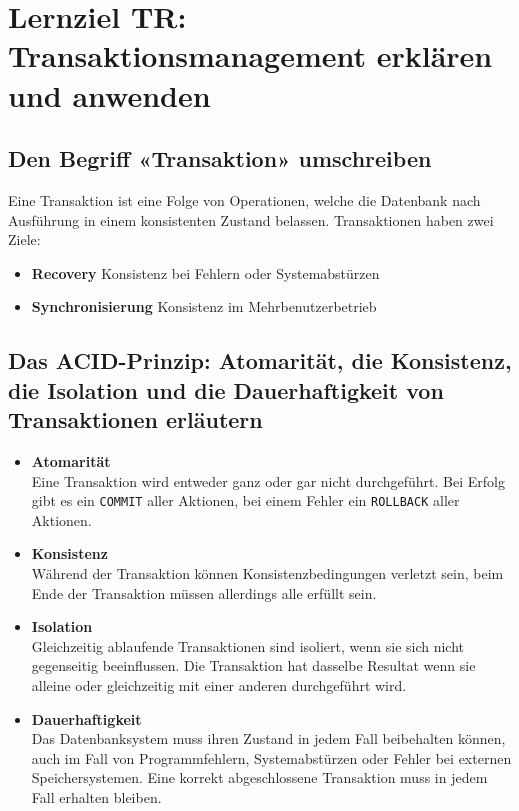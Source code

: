 \section{Lernziel TR: Transaktionsmanagement erklären und anwenden}

\subsection{Den Begriff «Transaktion» umschreiben}
Eine Transaktion ist eine Folge von Operationen, welche die Datenbank nach Ausführung in einem konsistenten Zustand belassen. Transaktionen haben zwei Ziele:

\begin{itemize}
  \item \textbf{Recovery}
  Konsistenz bei Fehlern oder Systemabstürzen
  \item \textbf{Synchronisierung}
  Konsistenz im Mehrbenutzerbetrieb
\end{itemize}

\newpage

\subsection{Das ACID-Prinzip: Atomarität, die Konsistenz, die Isolation und die Dauerhaftigkeit von Transaktionen erläutern}

\begin{itemize}
  \item \textbf{Atomarität} \\
  Eine Transaktion wird entweder ganz oder gar nicht durchgeführt. Bei Erfolg gibt es ein \texttt{COMMIT} aller Aktionen, bei einem Fehler ein \texttt{ROLLBACK} aller Aktionen.
  \item \textbf{Konsistenz} \\
  Während der Transaktion können Konsistenzbedingungen verletzt sein, beim Ende der Transaktion müssen allerdings alle erfüllt sein.
  \item \textbf{Isolation} \\
  Gleichzeitig ablaufende Transaktionen sind isoliert, wenn sie sich nicht gegenseitig beeinflussen. Die Transaktion hat dasselbe Resultat wenn sie alleine oder gleichzeitig mit einer anderen durchgeführt wird.
  \item \textbf{Dauerhaftigkeit} \\
  Das Datenbanksystem muss ihren Zustand in jedem Fall beibehalten können, auch im Fall von Programmfehlern, Systemabstürzen oder Fehler bei externen Speichersystemen. Eine korrekt abgeschlossene Transaktion muss in jedem Fall erhalten bleiben.
\end{itemize}

